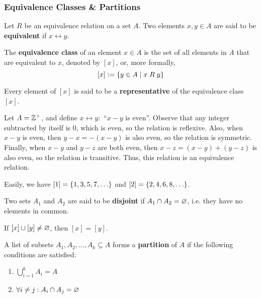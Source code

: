 \subsubsection{Equivalence Classes \& Partitions}

\begin{lemma}
    Let $R$ be an equivalence relation on a set $A$. Two elements $x, y \in A$ are said to be
    \textbf{equivalent} if $x\rel y$.
\end{lemma}

\begin{definition}
    The \textbf{equivalence class} of an element $x \in A$ is the set of all elements in $A$
    that are equivalent to $x$, denoted by $[x]$, or, more formally,
    \[
        [x] := \{y \in A \mid x\mathrel R y\}
    \]

    Every element of $[x]$ is said to be a \textbf{representative} of the equivalence class $[x]$.
\end{definition}

\begin{example}
    Let $A = \mathbb{Z}^+$, and define $x\rel y:$ ``$x-y$ is even''.
    Observe that any integer subtracted by itself is $0$, which is even,
    so the relation is reflexive.
    Also, when $x-y$ is even, then $y-x = -(x-y)$ is also even, so the relation is symmetric.
    Finally, when $x-y$ and $y-z$ are both even, then $x-z = (x-y) + (y-z)$ is also even,
    so the relation is transitive.
    Thus, this relation is an equivalence relation.

    Easily, we have $[1] = \{1, 3, 5, 7, \ldots\}$ and $[2] = \{2, 4, 6, 8, \ldots\}$.
\end{example}

\begin{lemma}\label{lem:disjoint-sets}
    Two sets $A_1$ and $A_2$ are said to be \textbf{disjoint} if $A_1 \cap A_2 = \varnothing$,
    i.e. they have no elements in common.
\end{lemma}

\begin{theorem}
    If $[x]\cup[y]\neq\varnothing$, then $[x] = [y]$.
\end{theorem}

\begin{definition}
    A list of subsets $A_1, A_2, \ldots, A_k \subseteq A$ forms a \textbf{partition} of $A$
    if the following conditions are satisfied:
    \begin{enumerate}
        \item $\displaystyle\bigcup_{i=1}^k A_i = A$
        \item $\forall i \neq j : A_i \cap A_j = \varnothing $
    \end{enumerate}
\end{definition}

